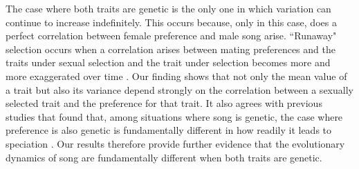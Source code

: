 \documentclass[12pt]{article}
\begin{document}
The case where both traits are genetic is the only one in which variation can continue to increase indefinitely. This occurs because, only in this case, does a perfect correlation between female preference and male song arise. ``Runaway" selection occurs when a correlation arises between mating preferences and the traits under sexual selection and the trait under selection becomes more and more exaggerated over time \cite{Lande:1981fk,Doorn:2000nx,Aoki:2001ly,Mead:2004uq}. Our finding shows that not only the mean value of a trait but also its variance depend strongly on the correlation between a sexually selected trait and the preference for that trait. It also agrees with previous studies that found that, among situations where song is genetic, the case where preference is also genetic is fundamentally different in how readily it leads to speciation \cite{Verzijden:2005vn,Gilman:2015fk}. Our results therefore provide further evidence that the evolutionary dynamics of song are fundamentally different when both traits are genetic.
 
\end{document}
